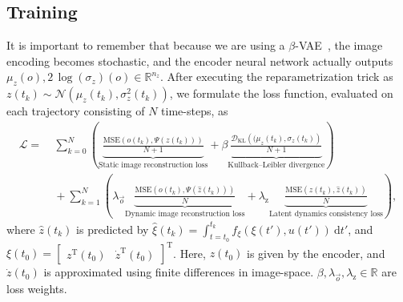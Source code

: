 \subsection{Training} 
It is important to remember that because we are using a $\beta$-\gls{VAE}~\cite{kingma2014auto, higgins2017beta}, the image encoding becomes stochastic, and the encoder neural network actually outputs $\mu_z(o), 2 \, \log(\sigma_z)(o) \in \mathbb{R}^{n_z}$. After executing the reparametrization trick as $z(t_k) \sim \mathcal{N}(\mu_z(t_k), \sigma_z^2(t_k))$, we formulate the loss function, evaluated on each trajectory consisting of $N$ time-steps, as
\begin{equation}\label{eq:training_loss}
\begin{split}
    \mathcal{L} =& \: \sum_{k=0}^{N} \left ( \underbrace{\frac{\mathrm{MSE}(o(t_k), \Psi(z(t_k)))}{N+1}}_{\text{Static image reconstruction loss}} + \beta \underbrace{\frac{\mathcal{D}_\mathrm{KL} \left ( (\mu_z(t_k), \sigma_z(t_k) \right )}{N+1}}_{\text{Kullback–Leibler divergence}} \right )\\
    &\: + \sum_{k=1}^{N} \left ( \lambda_{\vec{o}} \underbrace{ \frac{\mathrm{MSE}(o(t_k), \Psi(\hat{z}(t_k)))}{N}}_{\text{Dynamic image reconstruction loss}} + \lambda_{\mathrm{z}} \underbrace{\frac{\mathrm{MSE}(z(t_k), \hat{z}(t_k))}{N}}_{\text{Latent dynamics consistency loss}} \right ),
\end{split}
\end{equation}
where $\hat{z}(t_k)$ is predicted by $\hat{\xi}(t_k)  = \int_{t=t_0}^{t_k} f_\xi(\xi(t'), u(t')) \: \mathrm{d}t'$, and $\xi(t_0) = \begin{bmatrix}
    z^\mathrm{T}(t_0) & \dot{z}^\mathrm{T}(t_0)
\end{bmatrix}^\mathrm{T}$. Here, $z(t_0)$ is given by the encoder, and $\dot{z}(t_0)$ is approximated using finite differences in image-space. $\beta, \lambda_{\vec{o}}, \lambda_\mathrm{z} \in \mathbb{R}$ are loss weights.

